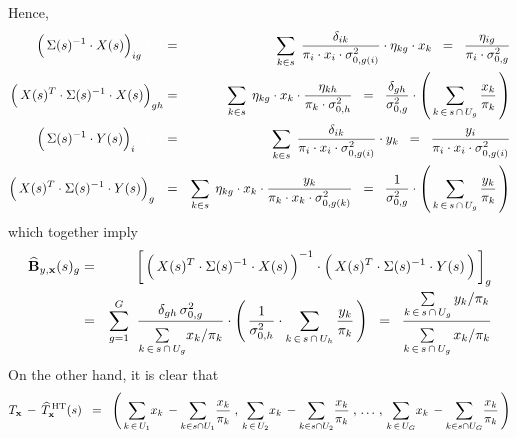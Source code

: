 Hence,
\begin{eqnarray*}
\left(\,\Sigma(s)^{-1} \overset{{\color{white}!}}{\cdot} X(s)\right)_{ig}{\color{white}111}
& = &
	\underset{k \in s}{\sum}\;\,
	\dfrac{\delta_{ik}}{\pi_{i} \cdot x_{i} \cdot \sigma^{2}_{0,g(i)}}
	\cdot
	\eta_{kg} \cdot x_{k}
\;\; = \;\;
	\dfrac{\eta_{ig}}{\pi_{i}\cdot\sigma^{2}_{0,g}}
\\
\left(\,X(s)^{T}\cdot\Sigma(s)^{-1} \overset{{\color{white}!}}{\cdot} X(s)\right)_{gh}
& = &
	\underset{k \in s}{\sum}\;\,
	\eta_{kg} \cdot x_{k} \cdot \dfrac{\eta_{kh}}{\pi_{k} \cdot \sigma^{2}_{0,h}}
\;\; = \;\;
	\dfrac{\delta_{gh}}{\sigma^{2}_{0,g}}
	\cdot
	\left(\,\underset{k\,\in\,s\,\cap\,U_{g}}{\sum}\,\dfrac{x_{k}}{\pi_{k}}\,\right)
\\
\left(\,\Sigma(s)^{-1} \overset{{\color{white}!}}{\cdot} Y(s)\right)_{i}{\color{white}1111}
& = &
	\underset{k \in s}{\sum}\;\,
	\dfrac{\delta_{ik}}{\pi_{i} \cdot x_{i} \cdot \sigma^{2}_{0,g(i)}}
	\cdot
	y_{k}
\;\; = \;\;
	\dfrac{y_{i}}{\pi_{i} \cdot x_{i} \cdot \sigma^{2}_{0,g(i)}}
\\
\left(\,X(s)^{T}\cdot\Sigma(s)^{-1} \overset{{\color{white}!}}{\cdot} Y(s)\right)_{g}{\color{white}1}
& = &
	\underset{k \in s}{\sum}\;\,
	\eta_{kg} \cdot x_{k} \cdot \dfrac{y_{k}}{\pi_{k} \cdot x_{k} \cdot \sigma^{2}_{0,g(k)}}
\;\; = \;\;
	\dfrac{1}{\sigma^{2}_{0,g}}
	\cdot
	\left(\, \underset{k\,\in\,s\,\cap\,U_{g}}{\sum}\, \dfrac{y_{k}}{\pi_{k}} \,\right)
\end{eqnarray*}
which together imply
\begin{eqnarray*}
\widehat{\mathbf{B}}_{y,\mathbf{x}}(s)_{g}
& = &
	\left[\,
		\left(\,X(s)^{T} \overset{{\color{white}!}}{\cdot} \Sigma(s)^{-1} \cdot X(s)\,\right)^{-1}
		\cdot
		\left(\,X(s)^{T} \overset{{\color{white}!}}{\cdot} \Sigma(s)^{-1} \cdot Y(s) \,\right)
	\,\right]_{g}
\\
& = &
	\overset{G}{\underset{g=1}{\sum}}\;\;
	\dfrac{
		\delta_{gh}\,\sigma^{2}_{0,g}
	}{
		\overset{{\color{white}.}}{\underset{k\,\in\,s\,\cap\,U_{g}}{\sum} x_{k}/\pi_{k}}
	}
	\cdot
	\left(\,
		\dfrac{1}{\sigma^{2}_{0,h}}
		\cdot
		\underset{k\,\in\,s\,\cap\,U_{h}}{\sum}\, \dfrac{y_{k}}{\pi_{k}}
	\,\right)
\;\; = \;\;
	\dfrac{
		\underset{k\,\in\,s\,\cap\,U_{g}}{\sum}\, y_{k} / \pi_{k}
	}{
		\overset{{\color{white}.}}{\underset{k\,\in\,s\,\cap\,U_{g}}{\sum}\, x_{k}/\pi_{k}}
	}
\end{eqnarray*}
On the other hand, it is clear that
\begin{equation*}
T_{\mathbf{x}} \,-\, \widehat{T}^{\,\textnormal{HT}}_{\mathbf{x}}(s)
\;\; = \;\;
	\left(\,
		\underset{k\,\in\,U_{1}}{\sum} x_{k} \, -  \underset{k \in s \cap U_{1}}{\sum} \dfrac{x_{k}}{\pi_{k}}
		\;,\,
		\underset{k\,\in\,U_{2}}{\sum} x_{k} \, -  \underset{k \in s \cap U_{2}}{\sum} \dfrac{x_{k}}{\pi_{k}}
		\;,\,
		\ldots
		\,,\,
		\underset{k\,\in\,U_{G}}{\sum} x_{k} \, -  \underset{k \in s \cap U_{G}}{\sum} \dfrac{x_{k}}{\pi_{k}}
	\,\right)
\end{equation*}
